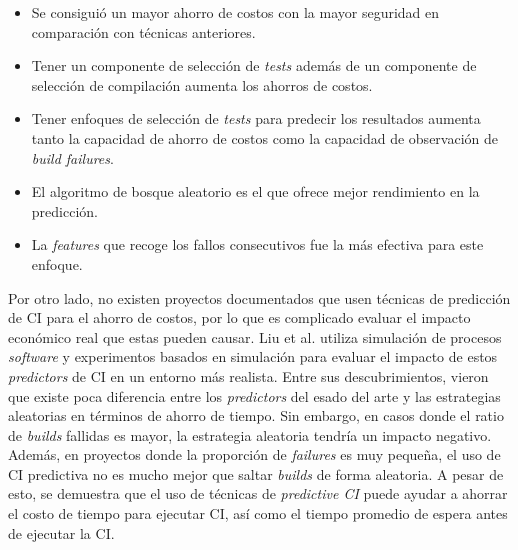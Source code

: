 \begin{itemize}
      \item Se consiguió un mayor ahorro de costos con la mayor seguridad en comparación con
      técnicas anteriores.
      \item Tener un componente de selección de \textit{tests} además de un componente de
      selección de compilación aumenta los ahorros de costos.
      \item Tener enfoques de selección de \textit{tests} para predecir los resultados aumenta
      tanto la capacidad de ahorro de costos como la capacidad de observación de \textit{build
      failures}.
      \item El algoritmo de bosque aleatorio es el que ofrece mejor rendimiento en la predicción.
      \item La \textit{features} que recoge los fallos consecutivos fue la más efectiva para este
      enfoque.
\end{itemize}

Por otro lado, no existen proyectos documentados que usen técnicas de predicción de CI
para el ahorro de costos, por lo que es complicado evaluar el impacto económico real que estas
pueden causar. Liu et al. \cite{19} utiliza simulación de procesos \textit{software} y
experimentos basados en simulación para evaluar el impacto de estos \textit{predictors} de
CI en un entorno más realista. Entre sus descubrimientos, vieron que existe poca
diferencia entre los \textit{predictors} del esado del arte y las estrategias aleatorias en
términos de ahorro de tiempo. Sin embargo, en casos donde el ratio de \textit{builds} fallidas
es mayor, la estrategia aleatoria tendría un impacto negativo. Además, en proyectos donde la
proporción de \textit{failures} es muy pequeña, el uso de CI predictiva no es mucho
mejor que saltar \textit{builds} de forma aleatoria. A pesar de esto, se demuestra que el uso
de técnicas de \textit{predictive CI} puede ayudar a ahorrar el costo de tiempo para ejecutar
CI, así como el tiempo promedio de espera antes de ejecutar la CI.

